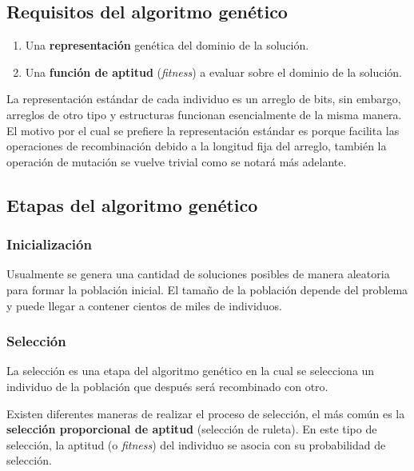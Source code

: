 \subsection{Requisitos del algoritmo gen\'etico}

\begin{enumerate}
  \item Una \textbf{representación} genética del dominio de la solución.
  \item Una \textbf{función de aptitud} (\textit{fitness}) a evaluar sobre el dominio de la solución.
\end{enumerate}

\noindent La representación estándar de cada individuo es un arreglo de bits, sin embargo, arreglos de otro tipo y estructuras funcionan esencialmente de la misma manera. El motivo por el cual se prefiere la representación estándar es porque facilita las operaciones de recombinación debido a la longitud fija del arreglo, también la operación de mutación se vuelve trivial como se notará más adelante.


\subsection{Etapas del algoritmo gen\'etico}

\subsubsection{Inicializaci\'on}

Usualmente se genera una cantidad de soluciones posibles de manera aleatoria para formar la población inicial. El tamaño de la población depende del problema y puede llegar a contener cientos de miles de individuos.

\subsubsection{Selecci\'on}

La selección es una etapa del algoritmo genético en la cual se selecciona un individuo de la población que después será recombinado con otro.\par

Existen diferentes maneras de realizar el proceso de selección, el más común es la \textbf{selección proporcional de aptitud} (selección de ruleta). En este tipo de selección, la aptitud (o \textit{fitness}) del individuo se asocia con su probabilidad de selección.\par


